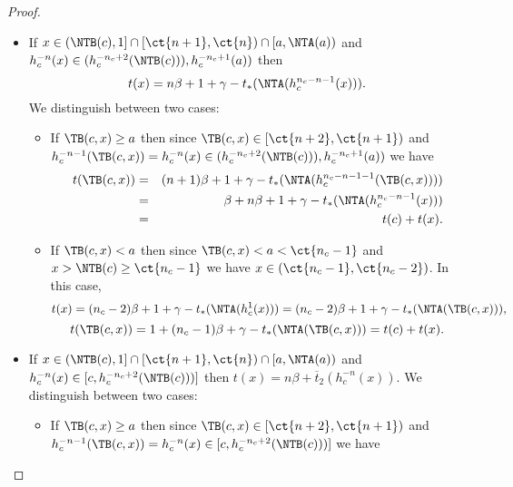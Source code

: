 \begin{proof}
\begin{enumerate}[label=(\roman*)]
\begin{itemize}
\begin{itemize}
\begin{itemize}
					\begin{eqnarray*}
					t(\TB(c,x)) & = & (n+1)\beta + \overline{t}_1(h_c^{-n-1}(\TB(c,x))) = \beta + n\beta + \overline{t}_1(h_c^{-n}(x))\\
					& = & t(c)+t(x).
					\end{eqnarray*}
					\item If $\TB(c,x) < a$ then since $\TB(c,x) < a < \ct{n_c-1}$ and $x > \NTB(c) \geq \ct{n_c-1}$  we have $x \in (\ct{n_c-1},\ct{n_c-2})$. Since  $\TB(c,x) < a$ we have $h_c^{-n_c+2}(x) < h_c^{-n_c+1}(a)$  and since we also have $h_c^{-n_c+2}(x) \geq h_c^{-n_c+1}(a) $  the only possibility is $\TB(c,x)=a$, which is a contradiction with the assumption $\TB(c,x)<a$.
				\end{itemize}
				\item If $x \in (\NTB(c),1] \cap [\ct{n+1},\ct{n}) \cap [a,\NTA(a))$ and \newline $h_c^{-n}(x) \in (h_c^{-n_c+2}(\NTB(c))),h_c^{-n_c+1}(a))$ then 
				$$t(x)=n\beta+1+\gamma-t_*(\NTA(h_c^{n_c-n-1}(x))).$$
				We distinguish between two cases:
				\begin{itemize}
					\item If $\TB(c,x)\geq a$ then since $\TB(c,x) \in [\ct{n+2},\ct{n+1})$ and $h_c^{-n-1}(\TB(c,x)) = h_c^{-n}(x) \in (h_c^{-n_c+2}(\NTB(c))),h_c^{-n_c+1}(a))$ we have
					\begin{eqnarray*}
						t(\TB(c,x)) &=& (n+1)\beta +1+\gamma - t_*(\NTA(h_c^{n_c-n-1-1}(\TB(c,x)))) \\
						&=& \beta + n\beta+1 +\gamma-t_*(\NTA(h_c^{n_c-n-1}(x))) \\ &=& t(c)+t(x).
					\end{eqnarray*}
					\item If $\TB(c,x) < a$ then since $\TB(c,x) < a < \ct{n_c-1}$ and $x > \NTB(c) \geq \ct{n_c-1}$  we have $x \in (\ct{n_c-1},\ct{n_c-2})$. In this case,
					$$t(x)= (n_c-2)\beta+1+\gamma-t_*(\NTA(h_c^{1}(x))) =  (n_c-2)\beta+1+\gamma-t_*(\NTA(\TB(c,x))),$$
					$$t(\TB(c,x))=1+(n_c-1)\beta + \gamma - t_*(\NTA(\TB(c,x))) = t(c)+t(x).$$
				\end{itemize}
				\item If $x \in (\NTB(c),1] \cap [\ct{n+1},\ct{n}) \cap [a,\NTA(a))$ and $h_c^{-n}(x) \in [c,h_c^{-n_c+2}(\NTB(c)))]$ then $t(x)=n\beta + \overline{t}_2(h_c^{-n}(x))$. We distinguish between two cases:
				\begin{itemize}
					\item If $\TB(c,x)\geq a$ then since $\TB(c,x) \in [\ct{n+2},\ct{n+1})$ and $h_c^{-n-1}(\TB(c,x)) = h_c^{-n}(x) \in [c,h_c^{-n_c+2}(\NTB(c)))]$ we have

\end{itemize}
\end{itemize}
\end{itemize}
\end{enumerate}
\end{proof}
